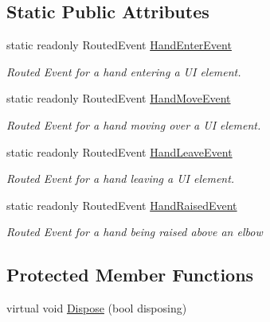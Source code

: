 \subsection*{Static Public Attributes}
\begin{DoxyCompactItemize}
\item 
static readonly Routed\-Event \hyperlink{class_microsoft_1_1_samples_1_1_kinect_1_1_basic_interactions_1_1_kinect_controller_a8d736bf496fd5452775107cd822a6e85}{Hand\-Enter\-Event}
\begin{DoxyCompactList}\small\item\em Routed Event for a hand entering a U\-I element. \end{DoxyCompactList}\item 
static readonly Routed\-Event \hyperlink{class_microsoft_1_1_samples_1_1_kinect_1_1_basic_interactions_1_1_kinect_controller_a35521ac87a13188ea5c027cbe15e8938}{Hand\-Move\-Event}
\begin{DoxyCompactList}\small\item\em Routed Event for a hand moving over a U\-I element. \end{DoxyCompactList}\item 
static readonly Routed\-Event \hyperlink{class_microsoft_1_1_samples_1_1_kinect_1_1_basic_interactions_1_1_kinect_controller_aa68d28645179f33282af2b14dc9259db}{Hand\-Leave\-Event}
\begin{DoxyCompactList}\small\item\em Routed Event for a hand leaving a U\-I element. \end{DoxyCompactList}\item 
static readonly Routed\-Event \hyperlink{class_microsoft_1_1_samples_1_1_kinect_1_1_basic_interactions_1_1_kinect_controller_afc084e0ca10a5076a66eb75a3a619b48}{Hand\-Raised\-Event}
\begin{DoxyCompactList}\small\item\em Routed Event for a hand being raised above an elbow \end{DoxyCompactList}\end{DoxyCompactItemize}
\subsection*{Protected Member Functions}
\begin{DoxyCompactItemize}
\item 
virtual void \hyperlink{class_microsoft_1_1_samples_1_1_kinect_1_1_basic_interactions_1_1_kinect_controller_a3f69ae7a19b6ce988af14e8d3d553c34}{Dispose} (bool disposing)
\end{DoxyCompactItemize}
